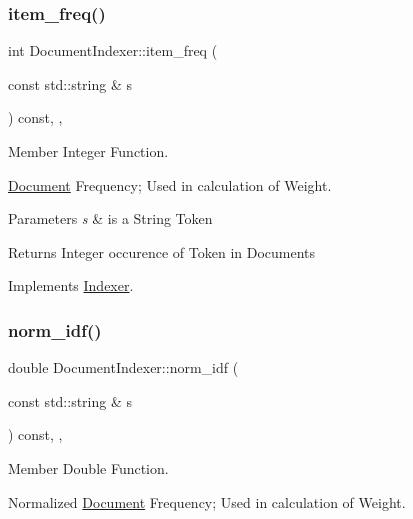 \subsubsection{\texorpdfstring{item\+\_\+freq()}{item\_freq()}}
{\footnotesize\ttfamily int Document\+Indexer\+::item\+\_\+freq (\begin{DoxyParamCaption}\item[{const std\+::string \&}]{s }\end{DoxyParamCaption}) const\hspace{0.3cm}{\ttfamily [override]}, {\ttfamily [private]}, {\ttfamily [virtual]}}



Member Integer Function. 

\hyperlink{class_document}{Document} Frequency; Used in calculation of Weight.


\begin{DoxyParams}{Parameters}
{\em s} & is a String Token \\
\hline
\end{DoxyParams}
\begin{DoxyReturn}{Returns}
Integer occurence of Token in Documents 
\end{DoxyReturn}


Implements \hyperlink{class_indexer_a9f9ea4d9946c531f257720cc9e9391eb}{Indexer}.

\mbox{\label{class_document_indexer_a1c366e241572edc6e1d256db906cac43}} 
\subsubsection{\texorpdfstring{norm\+\_\+idf()}{norm\_idf()}}
{\footnotesize\ttfamily double Document\+Indexer\+::norm\+\_\+idf (\begin{DoxyParamCaption}\item[{const std\+::string \&}]{s }\end{DoxyParamCaption}) const\hspace{0.3cm}{\ttfamily [override]}, {\ttfamily [private]}, {\ttfamily [virtual]}}



Member Double Function. 

Normalized \hyperlink{class_document}{Document} Frequency; Used in calculation of Weight.


